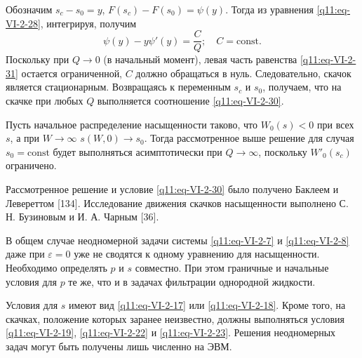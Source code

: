 Обозначим $s_c-s_0=y$, $F(s_c)-F(s_0)=\psi(y)$. Тогда из уравнения \eqref{q11:eq-VI-2-28}, интегрируя, получим
\begin{equation}\psi(y)-y\psi'(y)=\frac{C}{Q};\quad C=\mathrm{const}.\tag{VI.2.31}\label{q11:eq-VI-2-31}\end{equation}
Поскольку при $Q\to0$ (в начальный момент), левая часть равенства \eqref{q11:eq-VI-2-31} остается ограниченной, $C$ должно обращаться в нуль. Следовательно, скачок является стационарным. Возвращаясь к переменным $s_c$ и $s_0$, получаем, что на скачке при любых $Q$ выполняется соотношение \eqref{q11:eq-VI-2-30}.

Пусть начальное распределение насыщенности таково, что $W_0(s)<0$ при всех $s$, а при $W\to\infty$ $s(W,0)\to s_0$. Тогда рассмотренное выше решение для случая $s_0=\mathrm{const}$ будет выполняться асимптотически при $Q\to\infty$, поскольку $W'_0(s_c)$ ограничено.

Рассмотренное решение и условие \eqref{q11:eq-VI-2-30} было получено Баклеем и Левереттом [134]. Исследование движения скачков насыщенности выполнено С. Н. Бузиновым и И. А. Чарным [36].

В общем случае неодномерной задачи системы \eqref{q11:eq-VI-2-7} и \eqref{q11:eq-VI-2-8} даже при $\varepsilon=0$ уже не сводятся к одному уравнению для насыщенности. Необходимо определять $p$ и $s$ совместно. При этом граничные и начальные условия для $p$ те же, что и в задачах фильтрации однородной жидкости.

Условия для $s$ имеют вид \eqref{q11:eq-VI-2-17} или \eqref{q11:eq-VI-2-18}. Кроме того, на скачках, положение которых заранее неизвестно, должны выполняться условия \eqref{q11:eq-VI-2-19}, \eqref{q11:eq-VI-2-22} и \eqref{q11:eq-VI-2-23}. Решения неодномерных задач могут быть получены лишь численно на ЭВМ.
